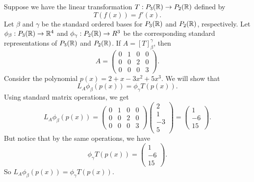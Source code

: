 \begin{eg}
    Suppose we have the linear transformation \( T: {P}_{3}(\mathbb{R}) \to {P}_{2}(\mathbb{R}) \) defined by
    \[  T(f(x)) = f'(x). \]
    Let \( \beta \) and \( \gamma \) be the standard ordered bases for \( {P}_{3}(\mathbb{R}) \) and \( {P}_{2}(\mathbb{R}) \), respectively. Let \( {\phi}_{\beta} : {P}_{3}(\mathbb{R}) \to \mathbb{R}^{4} \) and \( {\phi}_{\gamma}: {P}_{2}(\mathbb{R}) \to R^{3} \) be the corresponding standard representations of \( {P}_{3}(\mathbb{R}) \) and \( {P}_{2}(\mathbb{R}) \). If \( A = [T]_{\beta}^{\gamma}  \), then
    \[  A = \begin{pmatrix}
        0 & 1 & 0 & 0 \\
        0 & 0 & 2 & 0 \\
        0 & 0 & 0 & 3
    \end{pmatrix}. \]
    Consider the polynomial \( p(x) = 2 + x - 3x^{2} + 5x^{3}. \) We will show that 
    \[  {L}_{A}{\phi}_{\beta}(p(x)) = {\phi}_{\gamma}T(p(x)). \]
    Using standard matrix operations, we get
    \[  {L}_{A}{\phi}_{\beta}(p(x)) = \begin{pmatrix}
        0 & 1 & 0 & 0 \\
        0 & 0 & 2 & 0 \\
        0 & 0 & 0 & 3
    \end{pmatrix} \begin{pmatrix}
        2 \\
        1 \\
        -3 \\
        5
    \end{pmatrix} = \begin{pmatrix}
        1 \\
        -6 \\
        15
    \end{pmatrix}. \]
    But notice that by the same operations, we have
    \[  {\phi}_{\gamma}T(p(x)) = \begin{pmatrix}
        1 \\
        -6 \\
        15
    \end{pmatrix}. \]
    So \( {L}_{A}{\phi}_{\beta}(p(x)) = {\phi}_{\gamma}T(p(x)). \)
\end{eg}
